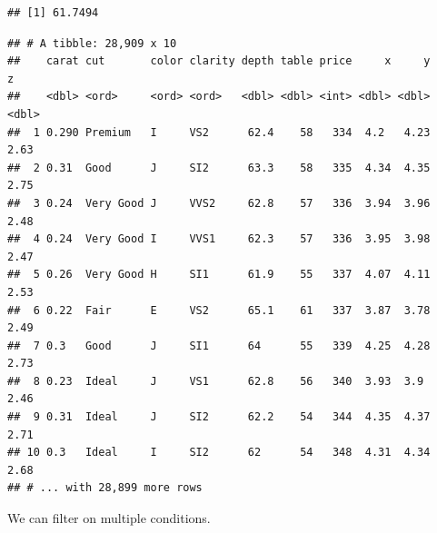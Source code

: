 \documentclass[
]{book}
\newenvironment{Shaded}{\begin{snugshade}}{\end{snugshade}}
\newcommand{\CommentTok}[1]{\textcolor[rgb]{0.56,0.35,0.01}{\textit{#1}}}
\newcommand{\DecValTok}[1]{\textcolor[rgb]{0.00,0.00,0.81}{#1}}
\newcommand{\KeywordTok}[1]{\textcolor[rgb]{0.13,0.29,0.53}{\textbf{#1}}}
\newcommand{\NormalTok}[1]{#1}
\newcommand{\OperatorTok}[1]{\textcolor[rgb]{0.81,0.36,0.00}{\textbf{#1}}}
\newcommand{\StringTok}[1]{\textcolor[rgb]{0.31,0.60,0.02}{#1}}
\begin{document}
\begin{Shaded}
\end{Shaded}

\begin{verbatim}
## [1] 61.7494
\end{verbatim}

\begin{Shaded}
\end{Shaded}

\begin{verbatim}
## # A tibble: 28,909 x 10
##    carat cut       color clarity depth table price     x     y     z
##    <dbl> <ord>     <ord> <ord>   <dbl> <dbl> <int> <dbl> <dbl> <dbl>
##  1 0.290 Premium   I     VS2      62.4    58   334  4.2   4.23  2.63
##  2 0.31  Good      J     SI2      63.3    58   335  4.34  4.35  2.75
##  3 0.24  Very Good J     VVS2     62.8    57   336  3.94  3.96  2.48
##  4 0.24  Very Good I     VVS1     62.3    57   336  3.95  3.98  2.47
##  5 0.26  Very Good H     SI1      61.9    55   337  4.07  4.11  2.53
##  6 0.22  Fair      E     VS2      65.1    61   337  3.87  3.78  2.49
##  7 0.3   Good      J     SI1      64      55   339  4.25  4.28  2.73
##  8 0.23  Ideal     J     VS1      62.8    56   340  3.93  3.9   2.46
##  9 0.31  Ideal     J     SI2      62.2    54   344  4.35  4.37  2.71
## 10 0.3   Ideal     I     SI2      62      54   348  4.31  4.34  2.68
## # ... with 28,899 more rows
\end{verbatim}

We can filter on multiple conditions.

\begin{Shaded}
\end{Shaded}
\end{document}
